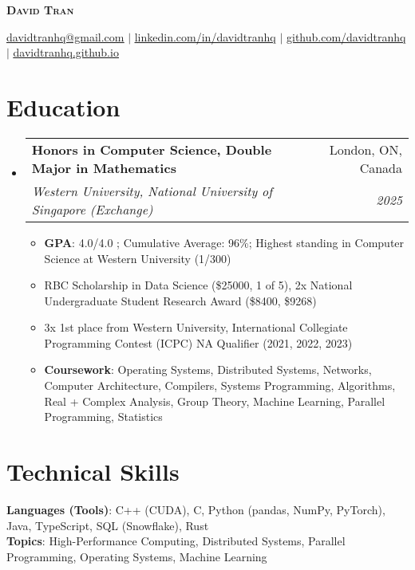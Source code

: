 \documentclass[letterpaper,10pt]{article}
\makeatletter
\newcommand{\resumeItem}[1]{
  \item\small{
    {#1 \vspace{-2pt}}
  }
}
\newcommand{\resumeSubheading}[4]{
  \vspace{-2pt}\item
    \begin{tabular*}{0.97\textwidth}[t]{l@{\extracolsep{\fill}}r}
      \textbf{#1} & #2 \\
      \textit{\small#3} & \textit{\small #4} \\
    \end{tabular*}\vspace{-7pt}
}
\newcommand{\resumeSubHeadingListStart}{\begin{itemize}[leftmargin=0.15in, label={}]}
\newcommand{\resumeSubHeadingListEnd}{\end{itemize}}
\newcommand{\resumeItemListStart}{\begin{itemize}}
\newcommand{\resumeItemListEnd}{\end{itemize}\vspace{-5pt}}
\makeatother
\begin{document}

\begin{center}
    \textbf{\Huge \scshape David Tran} \\ \vspace{1pt}

    \href{mailto:davidtranhq@gmail.com}{\underline{davidtranhq@gmail.com}} $|$
    \href{https://www.linkedin.com/in/davidtranhq}{\underline{linkedin.com/in/davidtranhq}} $|$
    \href{https://github.com/davidtranhq}{\underline{github.com/davidtranhq}} $|$
    \href{https://davidtranhq.github.io}{\underline{davidtranhq.github.io}}
\end{center}


\section{Education}
\resumeSubHeadingListStart
  \resumeSubheading
    {Honors in Computer Science, Double Major in Mathematics}{London, ON, Canada}
    {Western University, National University of Singapore (Exchange)}{2025}
    \resumeItemListStart
      \resumeItem{\textbf{GPA}: 4.0/4.0 ; Cumulative Average: 96\%; Highest standing in Computer Science at Western University (1/300)}
      \resumeItem{RBC Scholarship in Data Science (\$25000, 1 of 5), 2x National Undergraduate Student Research Award (\$8400, \$9268)}
      \resumeItem{3x 1st place from Western University, International Collegiate Programming Contest (ICPC) NA Qualifier (2021, 2022, 2023)}
      \resumeItem{\textbf{Coursework}{: Operating Systems, Distributed Systems, Networks, Computer Architecture, Compilers, Systems Programming, Algorithms, Real + Complex Analysis, Group Theory, Machine Learning, Parallel Programming, Statistics  }}

      \resumeItemListEnd
    \resumeSubHeadingListEnd

    \section{Technical Skills}
    \begin{itemize}[leftmargin=0.15in, label={}]
       \small{\item{
        \textbf{Languages (Tools)}{: C++ (CUDA), C, Python (pandas, NumPy, PyTorch), Java, TypeScript, SQL (Snowflake), Rust} \\
        \textbf{Topics}{: High-Performance Computing, Distributed Systems, Parallel Programming, Operating Systems, Machine Learning  }}} \\
    \end{itemize}
%
\end{document}
